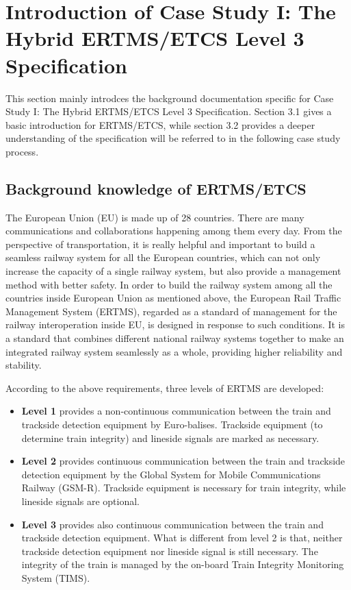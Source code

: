 \documentclass[article,dr=phil,type=drfinal,colorback,accentcolor=tud9c]{tudthesis}
\begin{document}
  
  \section{Introduction of Case Study I: The Hybrid ERTMS/ETCS Level 3 Specification}
  
  This section mainly introdces the background documentation specific for Case Study I: The Hybrid ERTMS/ETCS Level 3 Specification. Section 3.1 gives a basic introduction for ERTMS/ETCS, while section 3.2 provides a deeper understanding of the specification will be referred to in the following case study process.
 
  \subsection{Background knowledge of ERTMS/ETCS}
  
  The European Union (EU) is made up of 28 countries. There are many communications and collaborations happening among them every day. From the perspective of transportation, it is really helpful and important to build a seamless railway system for all the European countries, which can not only increase the capacity of a single railway system, but also provide a management method with better safety. In order to build the railway system among all the countries inside European Union as mentioned above, the European Rail Traffic Management System (ERTMS), regarded as a standard of management for the railway interoperation inside EU, is designed in response to such conditions. It is a standard that combines different national railway systems together to make an integrated railway system seamlessly as a whole, providing higher reliability and stability.
  
  According to the above requirements, three levels of ERTMS are developed:
  
  \begin{itemize}
  	
  \item \textbf{Level 1} provides a non-continuous communication between the train and trackside detection equipment by Euro-balises. Trackside equipment (to determine train integrity) and lineside signals are marked as necessary.
  
  \item \textbf{Level 2} provides continuous communication between the train and trackside detection equipment by the Global System for Mobile Communications Railway (GSM-R). Trackside equipment is necessary for train integrity, while lineside signals are optional.
  
  \item \textbf{Level 3} provides also continuous communication between the train and trackside detection equipment. What is different from level 2 is that, neither trackside detection equipment nor lineside signal is still necessary. The integrity of the train is managed by the on-board Train Integrity Monitoring System (TIMS).
  
  \end{itemize}
  
\end{document}
